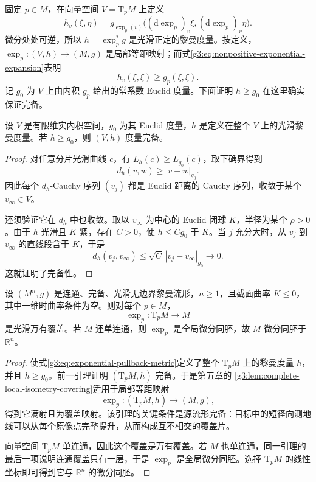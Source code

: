 固定 \(p\in M\)，在向量空间 \(V=\mathrm{T}_pM\) 上定义
\begin{equation}\label{g3:eq:exponential-pullback-metric}
	h_v(\xi,\eta)
	=g_{\exp_p(v)}\bigl((\mathrm d\exp_p)_v\xi,
		(\mathrm d\exp_p)_v\eta\bigr).
\end{equation}
微分处处可逆，所以 \(h=\exp_p^*g\) 是光滑正定的黎曼度量。按定义，\(\exp_p:(V,h)\to(M,g)\) 是局部等距映射；而式\eqref{g3:eq:nonpositive-exponential-expansion}表明
\[
	h_v(\xi,\xi)\ge g_p(\xi,\xi).
\]
记 \(g_0\) 为 \(V\) 上由内积 \(g_p\) 给出的常系数 Euclid 度量。下面证明 \(h\ge g_0\) 在这里确实保证完备。

\begin{lemma}\label{g3:lem:euclidean-dominated-metric-complete}
	设 \(V\) 是有限维实内积空间，\(g_0\) 为其 Euclid 度量，\(h\) 是定义在整个 \(V\) 上的光滑黎曼度量。若 \(h\ge g_0\)，则 \((V,h)\) 度量完备。
\end{lemma}
\begin{proof}
	对任意分片光滑曲线 \(c\)，有 \(L_h(c)\ge L_{g_0}(c)\)，取下确界得到
	\[
		d_h(v,w)\ge |v-w|_{g_0}.
	\]
	因此每个 \(d_h\)-Cauchy 序列 \((v_j)\) 都是 Euclid 距离的 Cauchy 序列，收敛于某个 \(v_\infty\in V\)。

	还须验证它在 \(d_h\) 中也收敛。取以 \(v_\infty\) 为中心的 Euclid 闭球 \(K\)，半径为某个 \(\rho>0\)。由于 \(h\) 光滑且 \(K\) 紧，存在 \(C>0\)，使 \(h\le Cg_0\) 于 \(K\)。当 \(j\) 充分大时，从 \(v_j\) 到 \(v_\infty\) 的直线段含于 \(K\)，于是
	\[
		d_h(v_j,v_\infty)
		\le\sqrt C\,|v_j-v_\infty|_{g_0}\longrightarrow0.
	\]
	这就证明了完备性。
\end{proof}

\begin{theorem}\label{g3:thm:cartan-hadamard}
	设 \((M^n,g)\) 是连通、完备、光滑无边界黎曼流形，\(n\ge1\)，且截面曲率 \(K\le0\)，其中一维时曲率条件为空。则对每个 \(p\in M\)，
	\[
		\exp_p:\mathrm{T}_pM\longrightarrow M
	\]
	是光滑万有覆盖。若 \(M\) 还单连通，则 \(\exp_p\) 是全局微分同胚，故 \(M\) 微分同胚于 \(\mathbb R^n\)。
\end{theorem}
\begin{proof}
	使式\eqref{g3:eq:exponential-pullback-metric}定义了整个 \(\mathrm{T}_pM\) 上的黎曼度量 \(h\)，并且 \(h\ge g_0\)。前一引理证明 \((\mathrm{T}_pM,h)\) 完备。于是第五章的 \cref{g3:lem:complete-local-isometry-covering}适用于局部等距映射
	\[
		\exp_p:(\mathrm{T}_pM,h)\longrightarrow(M,g),
	\]
	得到它满射且为覆盖映射。该引理的关键条件是源流形完备：目标中的短径向测地线可以从每个原像点完整提升，从而构成互不相交的覆盖片。

	向量空间 \(\mathrm{T}_pM\) 单连通，因此这个覆盖是万有覆盖。若 \(M\) 也单连通，同一引理的最后一项说明连通覆盖只有一层，于是 \(\exp_p\) 是全局微分同胚。选择 \(\mathrm{T}_pM\) 的线性坐标即可得到它与 \(\mathbb R^n\) 的微分同胚。
\end{proof}

